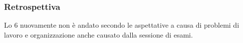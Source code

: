 \subsubsection{Retrospettiva}
\label{sec:sprint6_retrospettiva}
Lo  6 nuovamente non è andato secondo le aspettative a causa di problemi di lavoro e organizzazione anche causato dalla sessione di esami.\\